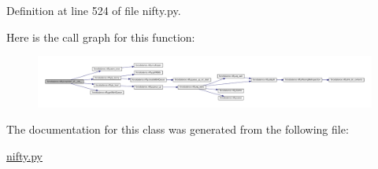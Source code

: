 \-Definition at line 524 of file nifty.\-py.



\-Here is the call graph for this function\-:
\nopagebreak
\begin{figure}[H]
\begin{center}
\leavevmode
\includegraphics[width=350pt]{classforcebalance_1_1nifty_1_1Unpickler__LP_ab1662d984cbb593543f4b73243b32ba3_cgraph}
\end{center}
\end{figure}




\-The documentation for this class was generated from the following file\-:\begin{DoxyCompactItemize}
\item 
\hyperlink{nifty_8py}{nifty.\-py}\end{DoxyCompactItemize}
